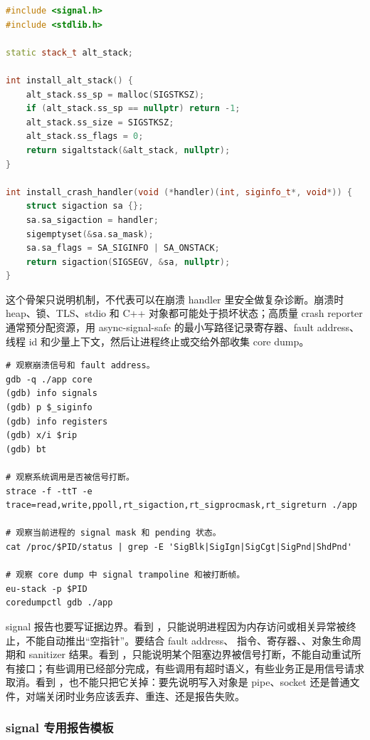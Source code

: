 \begin{lstlisting}[language=C++,caption={备用 signal stack 的最小骨架}]
#include <signal.h>
#include <stdlib.h>

static stack_t alt_stack;

int install_alt_stack() {
    alt_stack.ss_sp = malloc(SIGSTKSZ);
    if (alt_stack.ss_sp == nullptr) return -1;
    alt_stack.ss_size = SIGSTKSZ;
    alt_stack.ss_flags = 0;
    return sigaltstack(&alt_stack, nullptr);
}

int install_crash_handler(void (*handler)(int, siginfo_t*, void*)) {
    struct sigaction sa {};
    sa.sa_sigaction = handler;
    sigemptyset(&sa.sa_mask);
    sa.sa_flags = SA_SIGINFO | SA_ONSTACK;
    return sigaction(SIGSEGV, &sa, nullptr);
}
\end{lstlisting}

这个骨架只说明机制，不代表可以在崩溃 handler 里安全做复杂诊断。崩溃时 heap、锁、TLS、stdio 和 C++ 对象都可能处于损坏状态；高质量 crash reporter 通常预分配资源，用 async-signal-safe 的最小写路径记录寄存器、fault address、线程 id 和少量上下文，然后让进程终止或交给外部收集 core dump。

\begin{lstlisting}[numbers=none,caption={signal 证据包}]
# 观察崩溃信号和 fault address。
gdb -q ./app core
(gdb) info signals
(gdb) p $_siginfo
(gdb) info registers
(gdb) x/i $rip
(gdb) bt

# 观察系统调用是否被信号打断。
strace -f -ttT -e trace=read,write,ppoll,rt_sigaction,rt_sigprocmask,rt_sigreturn ./app

# 观察当前进程的 signal mask 和 pending 状态。
cat /proc/$PID/status | grep -E 'SigBlk|SigIgn|SigCgt|SigPnd|ShdPnd'

# 观察 core dump 中 signal trampoline 和被打断帧。
eu-stack -p $PID
coredumpctl gdb ./app
\end{lstlisting}

signal 报告也要写证据边界。看到 ，只能说明进程因为内存访问或相关异常被终止，不能自动推出“空指针”。要结合 fault address、 指令、寄存器、、对象生命周期和 sanitizer 结果。看到 ，只能说明某个阻塞边界被信号打断，不能自动重试所有接口；有些调用已经部分完成，有些调用有超时语义，有些业务正是用信号请求取消。看到 ，也不能只把它关掉：要先说明写入对象是 pipe、socket 还是普通文件，对端关闭时业务应该丢弃、重连、还是报告失败。

\subsubsection{signal 专用报告模板}

